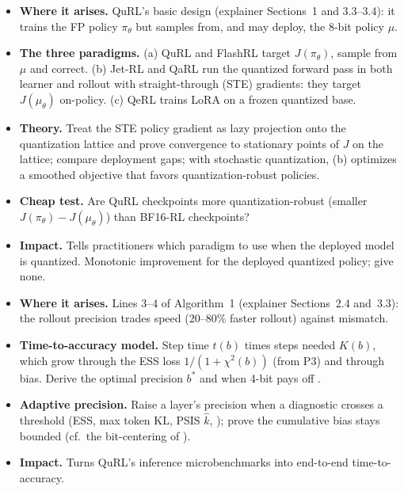 \documentclass[11pt]{article}
\begin{document}
\begin{itemize}
\item \textbf{Where it arises.} QuRL's basic design (explainer Sections~1 and 3.3--3.4): it trains the FP policy $\pi_\theta$ but samples from, and may deploy, the 8-bit policy $\mu$.
\item \textbf{The three paradigms.} (a) QuRL and FlashRL target $J(\pi_\theta)$, sample from $\mu$ and correct. (b) Jet-RL \citep{xi2026jetrl} and QaRL \citep{gu2026qarl} run the quantized forward pass in both learner and rollout with straight-through (STE) gradients: they target $J(\mu_\theta)$ on-policy. (c) QeRL \citep{huang2025qerl} trains LoRA on a frozen quantized base.
\item \textbf{Theory.} Treat the STE policy gradient as lazy projection onto the quantization lattice \citep{courbariaux2015binaryconnect,bai2019proxquant,yin2019ste} and prove convergence to stationary points of $J$ on the lattice; compare deployment gaps; with stochastic quantization, (b) optimizes a smoothed objective that favors quantization-robust policies.
\item \textbf{Cheap test.} Are QuRL checkpoints more quantization-robust (smaller $J(\pi_\theta)-J(\mu_\theta)$) than BF16-RL checkpoints?
\item \textbf{Impact.} Tells practitioners which paradigm to use when the deployed model is quantized. \tagopen{} Monotonic improvement for the deployed quantized policy; \citet{liang2026mirage} give none.
\end{itemize}

\begin{itemize}
\item \textbf{Where it arises.} Lines 3--4 of Algorithm~1 (explainer Sections~2.4 and~3.3): the rollout precision trades speed (20--80\% faster rollout) against mismatch.
\item \textbf{Time-to-accuracy model.} Step time $t(b)$ times steps needed $K(b)$, which grow through the ESS loss $1/(1+\chi^2(b))$ (from P3) and through bias. Derive the optimal precision $b^*$ and when 4-bit pays off \citep[cf.][]{kumar2024precision}.
\item \textbf{Adaptive precision.} Raise a layer's precision when a diagnostic crosses a threshold (ESS, max token KL, PSIS $\hat k$, \citealp{vehtari2024psis}); prove the cumulative bias stays bounded (cf.\ the bit-centering of \citealp{desa2018halp}).
\item \textbf{Impact.} Turns QuRL's inference microbenchmarks into end-to-end time-to-accuracy.
\end{itemize}
\end{document}
